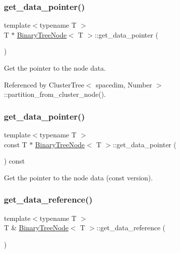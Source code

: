 \subsubsection{\texorpdfstring{get\+\_\+data\+\_\+pointer()}{get\_data\_pointer()}\hspace{0.1cm}{\footnotesize\ttfamily [1/2]}}
{\footnotesize\ttfamily template$<$typename T $>$ \\
T $\ast$ \hyperlink{classBinaryTreeNode}{Binary\+Tree\+Node}$<$ T $>$\+::get\+\_\+data\+\_\+pointer (\begin{DoxyParamCaption}{ }\end{DoxyParamCaption})}

Get the pointer to the node data. 

Referenced by Cluster\+Tree$<$ spacedim, Number $>$\+::partition\+\_\+from\+\_\+cluster\+\_\+node().

\mbox{\label{classBinaryTreeNode_acb9eb20251b6fdde199264527499c9ca}} 
\subsubsection{\texorpdfstring{get\+\_\+data\+\_\+pointer()}{get\_data\_pointer()}\hspace{0.1cm}{\footnotesize\ttfamily [2/2]}}
{\footnotesize\ttfamily template$<$typename T $>$ \\
const T $\ast$ \hyperlink{classBinaryTreeNode}{Binary\+Tree\+Node}$<$ T $>$\+::get\+\_\+data\+\_\+pointer (\begin{DoxyParamCaption}{ }\end{DoxyParamCaption}) const}

Get the pointer to the node data (const version). \mbox{\label{classBinaryTreeNode_ad24220a78b219a242dc66be86cf6ddd9}} 
\subsubsection{\texorpdfstring{get\+\_\+data\+\_\+reference()}{get\_data\_reference()}\hspace{0.1cm}{\footnotesize\ttfamily [1/2]}}
{\footnotesize\ttfamily template$<$typename T $>$ \\
T \& \hyperlink{classBinaryTreeNode}{Binary\+Tree\+Node}$<$ T $>$\+::get\+\_\+data\+\_\+reference (\begin{DoxyParamCaption}{ }\end{DoxyParamCaption})}

